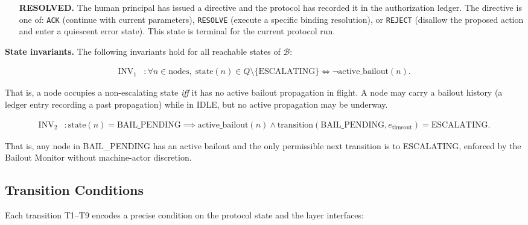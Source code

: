 \begin{itemize}
\item[\textbf{RESOLVED.}] The human principal has issued a directive and the protocol has recorded it in the authorization ledger. The directive is one of: \texttt{ACK} (continue with current parameters), \texttt{RESOLVE} (execute a specific binding resolution), or \texttt{REJECT} (disallow the proposed action and enter a quiescent error state). This state is terminal for the current protocol run.
\end{itemize}

\bigskip
\noindent\textbf{State invariants.} The following invariants hold for all reachable states of $\mathcal{B}$:

\begin{align}
\text{INV}_1 &: \forall n \in \text{nodes},\; \text{state}(n) \in Q \setminus \{\text{ESCALATING}\} \iff \neg\text{active\_bailout}(n). \tag{INV-1}
\end{align}

That is, a node occupies a non-escalating state \emph{iff} it has no active bailout propagation in flight. A node may carry a bailout history (a ledger entry recording a past propagation) while in IDLE, but no active propagation may be underway.

\begin{align}
\text{INV}_2 &: \text{state}(n) = \text{BAIL\_PENDING} \implies \text{active\_bailout}(n) \land \text{transition}(\text{BAIL\_PENDING}, e_{\text{timeout}}) = \text{ESCALATING}. \tag{INV-2}
\end{align}

That is, any node in BAIL\_PENDING has an active bailout and the only permissible next transition is to ESCALATING, enforced by the Bailout Monitor without machine-actor discretion.

\subsection{Transition Conditions}\label{sec:transitions}

Each transition T1–T9 encodes a precise condition on the protocol state and the \bxthree{} layer interfaces:

